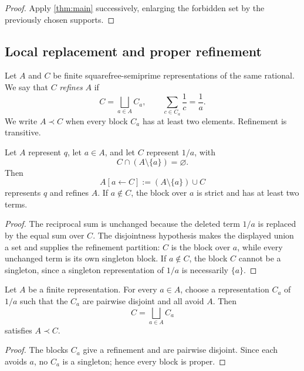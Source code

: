 \begin{proof}
Apply \cref{thm:main} successively, enlarging the forbidden set by the previously chosen supports.
\end{proof}

\subsection{Local replacement and proper refinement}

\begin{definition}
Let $A$ and $C$ be finite squarefree-semiprime representations of the same rational.  We say that $C$ \emph{refines} $A$ if
\[
 C=\bigsqcup_{a\in A}C_a,
 \qquad
 \sum_{c\in C_a}\frac1c=\frac1a.
\]
We write $A\prec C$ when every block $C_a$ has at least two elements.  Refinement is transitive.
\end{definition}

\begin{lemma}
\label{lem:local-replacement}
Let $A$ represent $q$, let $a\in A$, and let $C$ represent $1/a$, with
\[
 C\cap(A\setminus\{a\})=\varnothing.
\]
Then
\[
 A[a\leftarrow C]:=(A\setminus\{a\})\cup C
\]
represents $q$ and refines $A$.  If $a\notin C$, the block over $a$ is strict and has at least two terms.
\end{lemma}

\begin{proof}
The reciprocal sum is unchanged because the deleted term $1/a$ is replaced by the equal sum over $C$.  The disjointness hypothesis makes the displayed union a set and supplies the refinement partition: $C$ is the block over $a$, while every unchanged term is its own singleton block.  If $a\notin C$, the block $C$ cannot be a singleton, since a singleton representation of $1/a$ is necessarily $\{a\}$.
\end{proof}

\begin{corollary}
\label{cor:simultaneous-proper-replacement}
Let $A$ be a finite representation.  For every $a\in A$, choose a representation $C_a$ of $1/a$ such that the $C_a$ are pairwise disjoint and all avoid $A$.  Then
\[
 C=\bigsqcup_{a\in A}C_a
\]
satisfies $A\prec C$.
\end{corollary}

\begin{proof}
The blocks $C_a$ give a refinement and are pairwise disjoint.  Since each avoids $a$, no $C_a$ is a singleton; hence every block is proper.
\end{proof}

